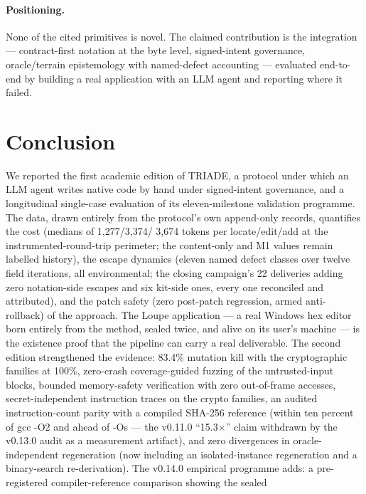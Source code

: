 \documentclass[11pt,a4paper]{article}
\begin{document}
\paragraph{Positioning.} None of the cited primitives is novel. The
claimed contribution is the integration --- contract-first notation at
the byte level, signed-intent governance, oracle/terrain epistemology
with named-defect accounting --- evaluated end-to-end by building a real
application with an LLM agent and reporting where it failed.

\section{Conclusion}\label{sec:conclusion}

We reported the first academic edition of TRIADE, a protocol under which
an LLM agent writes native code by hand under signed-intent governance,
and a longitudinal single-case evaluation of its eleven-milestone
validation programme. The data, drawn entirely from the protocol's own
append-only records, quantifies the cost (medians of 1{,}277/3{,}374/
3{,}674 tokens per locate/edit/add at the instrumented-round-trip
perimeter; the content-only and M1 values remain labelled history), the
escape dynamics (eleven named defect classes over twelve field
iterations, all environmental; the closing campaign's 22 deliveries
adding zero notation-side escapes and six kit-side ones, every one
reconciled and attributed), and the patch safety (zero
post-patch regression, armed anti-rollback) of the approach. The Loupe
application --- a real Windows hex editor born entirely from the method,
sealed twice, and alive on its user's machine --- is the existence proof
that the pipeline can carry a real deliverable. The second edition strengthened the
evidence: 83.4\% mutation kill with the cryptographic families at
100\%, zero-crash coverage-guided fuzzing of the untrusted-input blocks,
bounded memory-safety verification with zero out-of-frame accesses,
secret-independent instruction traces on the crypto families, an audited
instruction-count parity with a compiled SHA-256 reference (within ten
percent of gcc -O2 and ahead of -Os --- the v0.11.0 ``15.3$\times$''
claim withdrawn by the v0.13.0 audit as a measurement artifact), and zero divergences in oracle-independent regeneration (now including an
isolated-instance regeneration and a binary-search re-derivation). The v0.14.0 empirical programme
adds: a pre-registered compiler-reference comparison showing the sealed
\end{document}

